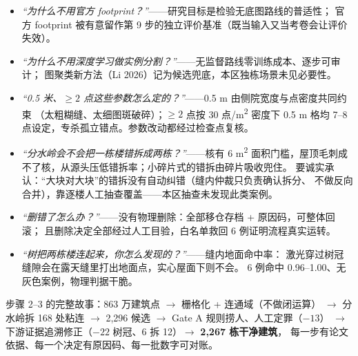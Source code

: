 \begin{itemize}
\item \emph{``为什么不用官方 footprint？''}——研究目标是检验无底图路线的普适性；
      官方 footprint 被有意留作第 9 步的独立评价基准（既当输入又当考卷会让评价失效）。
\item \emph{``为什么不用深度学习做实例分割？''}——无监督路线零训练成本、逐步可审计；
      图聚类新方法（Li 2026）记为候选兜底，本区独栋场景未见必要性。
\item \emph{``0.5 米、$\geq2$ 点这些参数怎么定的？''}——0.5 m 由侧院宽度与点密度共同约束
      （太粗糊缝、太细图斑破碎）；$\geq2$ 点按 30 点/m\textsuperscript{2} 密度下
      0.5 m 格均 7--8 点设定，专杀孤立错点。参数改动都经过检查点复核。
\item \emph{``分水岭会不会把一栋楼错拆成两栋？''}——核有 6 m\textsuperscript{2}
      面积门槛，屋顶毛刺成不了核，从源头压低错拆率；小碎片式的错拆由碎片吸收兜住。
      要诚实承认：``大块对大块''的错拆没有自动纠错（缝内仲裁只负责确认拆分、
      不做反向合并），靠逐楼人工抽查覆盖——本区抽查未发现此类案例。
\item \emph{``删错了怎么办？''}——没有物理删除：全部移仓存档 + 原因码，可整体回滚；
      且删除决定全部经过人工目验，白名单救回 6 例证明流程真实运转。
\item \emph{``树把两栋楼连起来，你怎么发现的？''}——缝内地面命中率：
      激光穿过树冠缝隙会在露天缝里打出地面点，实心屋面下则不会。
      6 例命中 0.96--1.00、无灰色案例，物理判据干脆。
\end{itemize}

\begin{plainbox}[：模块 6 小结（也是全讲义收尾）]
步骤 2--3 的完整故事：863 万建筑点 $\to$ 栅格化 + 连通域（不做闭运算）
$\to$ 分水岭拆 168 处粘连 $\to$ 2{,}296 候选 $\to$ Gate A 规则捞人、人工定罪（$-13$）
$\to$ 下游证据追溯修正（$-22$ 树冠、6 拆 12）$\to$ \textbf{2{,}267 栋干净建筑}，
每一步有论文依据、每一个决定有原因码、每一批数字可对账。
\end{plainbox}
